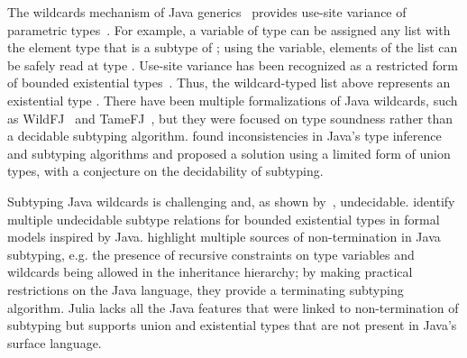 The wildcards mechanism of Java generics~\cite{bib:torgersen:wildcards:2004}
provides use-site variance of parametric
types~\cite{bib:thorup:unif-genericity:1999}.
For example, a variable of type 
can be assigned any list with the element type that is a subtype of ;
using the variable, elements of the list can be safely read at type .
Use-site variance has been recognized as a restricted form of bounded existential
types~\cite{bib:igarashi:variance:2002}.
Thus, the wildcard-typed list above represents an existential
type .
There have been multiple formalizations of Java wildcards,
such as WildFJ~\cite{bib:torgersen:wildfj:2005} and
TameFJ~\cite{bib:cameron:java-wildcards:2008}, but they
were focused on type soundness rather than a decidable subtyping algorithm.
\citet{bib:smith:java-type-inf:2008} found inconsistencies in Java's type inference
and subtyping algorithms and proposed a solution using a limited form of union
types, with a conjecture on the decidability of subtyping.

Subtyping Java wildcards is challenging and, as shown
by~\citet{bib:grigore:java-undec:2017},
undecidable.
\citet{bib:wehr:dec-bounded-exist:2009} identify multiple undecidable subtype
relations for bounded existential types in formal models inspired by Java.
\citet{bib:tate:taming-wildcards:2011} highlight multiple sources of 
non-termination in Java subtyping,
e.g. the presence of recursive constraints on type variables
and wildcards being allowed in the inheritance hierarchy;
by making practical restrictions on the Java language,
they provide a terminating subtyping algorithm.
Julia lacks all the Java features that were linked to non-termination of
subtyping but supports union and existential types that are not present
in Java's surface language.
